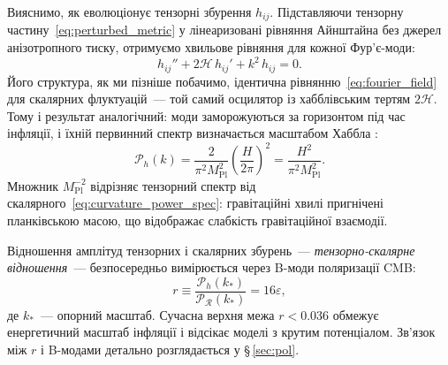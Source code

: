 Вияснимо, як еволюціонує тензорні збурення $h_{ij}$. Підставляючи тензорну
частину~\eqref{eq:perturbed_metric} у лінеаризовані рівняння
Айнштайна без джерел анізотропного тиску, отримуємо хвильове
рівняння для кожної Фур'є-моди:
\begin{equation}\label{eq:tensor_wave_eq}
  h_{ij}'' + 2\mathcal{H}\,h_{ij}' + k^2\,h_{ij} = 0.
\end{equation}
Його структура, як ми пізніше побачимо, ідентична рівнянню~\eqref{eq:fourier_field}
для скалярних флуктуацій~--- той самий осцилятор із
хабблівським тертям $2\mathcal{H}$. Тому і результат
аналогічний: моди заморожуються за горизонтом під час
інфляції, і їхній первинний спектр визначається масштабом
Хаббла \cite{starobinsky_1979}:
\begin{equation}\label{eq:tensor_power_spec}
  \mathcal{P}_h(k)
    = \frac{2}{\pi^2 M_\mathrm{Pl}^2}
      \left(\frac{H}{2\pi}\right)^{\!2}
    = \frac{H^2}{\pi^2 M_\mathrm{Pl}^2}.
\end{equation}
Множник $M_\mathrm{Pl}^{-2}$ відрізняє тензорний спектр від
скалярного~\eqref{eq:curvature_power_spec}: гравітаційні хвилі
пригнічені планківською масою, що відображає слабкість
гравітаційної взаємодії.

Відношення амплітуд тензорних і скалярних збурень~---
\emph{тензорно-скалярне відношення}~--- безпосередньо
вимірюється через B-моди поляризації CMB:
\begin{equation}\label{eq:tensor_scalar_ratio}
  r \equiv \frac{\mathcal{P}_h(k_*)}
               {\mathcal{P}_{\mathcal{R}}(k_*)}
    = 16\varepsilon,
\end{equation}
де $k_*$~--- опорний масштаб. Сучасна верхня межа
$r < 0.036$ \cite{bicep_keck_2021} обмежує енергетичний
масштаб інфляції і відсікає моделі з крутим потенціалом.
Зв'язок між $r$ і B-модами детально розглядається у
§\,\ref{sec:pol}.